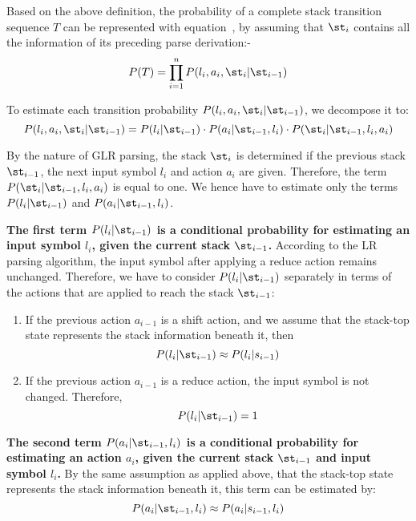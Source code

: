 Based on the above definition, the probability of a complete stack
transition sequence $T$ can be represented with equation~, by
assuming that $\st_i$ contains all the information of its preceding
parse derivation:-
\begin{equation}
  \label{eq:pglr-bayes}
  P(T) = \prod_{i=1}^n P(l_i,a_i,\st_i|\st_{i-1})
\end{equation}

To estimate each transition probability $P(l_i,a_i,\st_i|\st_{i-1})$, we 
decompose it to:
\begin{equation}
  \label{eq:pglr-bayes2}
  P(l_i,a_i,\st_i|\st_{i-1}) = P(l_i|\st_{i-1}) \cdot
  P(a_i|\st_{i-1},l_i) \cdot P(\st_i|\st_{i-1},l_i,a_i)
\end{equation}

By the nature of GLR parsing, the stack $\st_i$ is determined if the previous
stack $\st_{i-1}$, the next input symbol $l_i$ and action $a_i$ are
given. Therefore, the term $P(\st_i|\st_{i-1},l_i,a_i)$ is equal to one. We
hence have to estimate only the terms $P(l_i|\st_{i-1})$ and
$P(a_i|\st_{i-1},l_i)$.

{\bf The first term $P(l_i|\st_{i-1})$ is a conditional probability for
estimating an input symbol $l_i$, given the current stack $\st_{i-1}$.}
According to the LR parsing algorithm, the input symbol after applying a
reduce action remains unchanged. Therefore, we have to consider
$P(l_i|\st_{i-1})$ separately in terms of the actions that are applied
to reach the stack $\st_{i-1}$:
\begin{enumerate}
\item If the previous action $a_{i-1}$ is a shift action, and we assume
  that the stack-top state represents the stack information
  beneath it, then
  \begin{equation}
    \label{eq:pglr-prob1a}
    P(l_i|\st_{i-1}) \approx P(l_i|s_{i-1})
  \end{equation}
\item If the previous action $a_{i-1}$ is a reduce action, the input
  symbol is not changed. Therefore,
  \begin{equation}
    \label{eq:pglr-prob1b}
    P(l_i|\st_{i-1}) = 1
  \end{equation}
\end{enumerate}

{\bf The second term $P(a_i|\st_{i-1},l_i)$ is a conditional probability
for estimating an action $a_i$, given the current stack $\st_{i-1}$ and
input symbol $l_i$.} By the same assumption as applied above, that the
stack-top state represents the stack information beneath it, this term
can be estimated by:
\begin{equation}
  \label{eq:pglr-prob2}
  P(a_i|\st_{i-1},l_i) \approx P(a_i|s_{i-1},l_i)
\end{equation}

